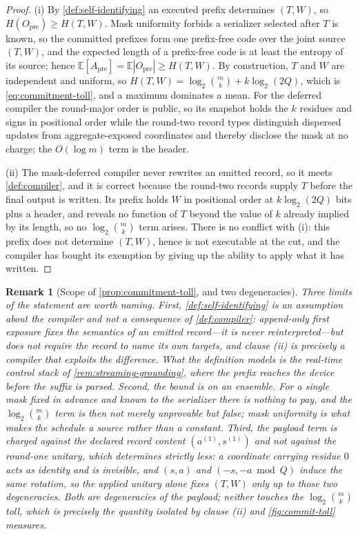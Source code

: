 \documentclass[a4paper,twocolumn,10pt,unpublished]{quantumarticle}
\newtheorem{remark}{Remark}
\begin{document}
\begin{proof}
(i) By \cref{def:self-identifying} an executed prefix determines
$(T,W)$, so $H(O_{\mathrm{pre}})\geq H(T,W)$.  Mask uniformity forbids
a serializer selected after $T$ is known, so the committed prefixes
form one prefix-free code over the joint source $(T,W)$, and the
expected length of a prefix-free code is at least the entropy of its
source; hence
$\mathbb E[A_{\mathrm{pre}}]=\mathbb E|O_{\mathrm{pre}}|\geq H(T,W)$.
By construction, $T$ and $W$ are independent and uniform, so
$H(T,W)=\log_2\binom{m}{k}+k\log_2(2Q)$, which is
\eqref{eq:commitment-toll}, and a maximum dominates a mean.  For the
deferred compiler the round-major order is public, so its snapshot holds
the $k$ residues and signs in positional order while the round-two record
types distinguish dispersed updates from aggregate-exposed coordinates
and thereby disclose the mask at no charge;
the $O(\log m)$ term is the header.

(ii) The mask-deferred compiler never rewrites an emitted record, so it
meets \cref{def:compiler}, and it is correct because the round-two
records supply $T$ before the final output is written.  Its prefix
holds $W$ in positional order at $k\log_2(2Q)$ bits plus a header, and
reveals no function of $T$ beyond the value of $k$ already implied by
its length, so no $\log_2\binom{m}{k}$ term arises.  There is no
conflict with (i): this prefix does not determine $(T,W)$, hence is not
executable at the cut, and the compiler has bought its exemption by
giving up the ability to apply what it has written.
\end{proof}

\begin{remark}[Scope of \cref{prop:commitment-toll}, and two degeneracies]
\label{rem:self-id-scope}
Three limits of the statement are worth naming.  First,
\cref{def:self-identifying} is an assumption about the compiler and not
a consequence of \cref{def:compiler}: append-only first exposure fixes
the \emph{semantics} of an emitted record---it is never
reinterpreted---but does not require the record to name its own
targets, and clause (ii) is precisely a compiler that exploits the
difference.  What the definition models is the real-time control stack
of \cref{rem:streaming-grounding}, where the prefix reaches the device
before the suffix is parsed.  Second, the bound is on an ensemble.  For
a single mask fixed in advance and known to the serializer there is
nothing to pay, and the $\log_2\binom{m}{k}$ term is then not merely
unprovable but false; mask uniformity is what makes the schedule a
source rather than a constant.  Third, the payload term is charged
against the declared record content $(a^{(1)},s^{(1)})$ and not against
the round-one unitary, which determines strictly less: a coordinate
carrying residue $0$ acts as identity and is invisible, and
$(s,a)$ and $(-s,-a\bmod Q)$ induce the same rotation, so the applied
unitary alone fixes $(T,W)$ only up to those two degeneracies.  Both
are degeneracies of the payload; neither touches the
$\log_2\binom{m}{k}$ toll, which is precisely the quantity isolated by clause (ii)
and \cref{fig:commit-toll} measures.
\end{remark}
\end{document}

